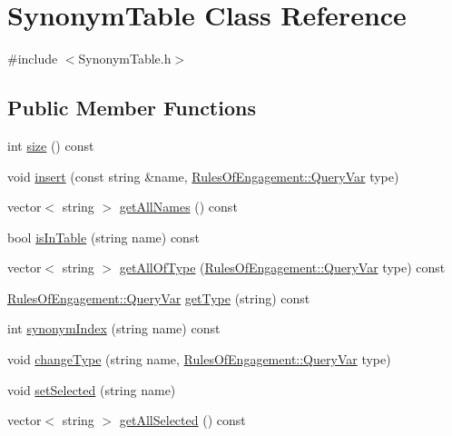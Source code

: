 \hypertarget{class_synonym_table}{\section{Synonym\-Table Class Reference}
\label{class_synonym_table}
}


{\ttfamily \#include $<$Synonym\-Table.\-h$>$}

\subsection*{Public Member Functions}
\begin{DoxyCompactItemize}
\item 
int \hyperlink{class_synonym_table_a8cddc6773a55141179cc844d39ed1c1f}{size} () const 
\item 
void \hyperlink{class_synonym_table_abda36f6346220b4d99efc9e522f57ac1}{insert} (const string \&name, \hyperlink{class_rules_of_engagement_a5dd2b28fd0c906d9b08e29e371713ead}{Rules\-Of\-Engagement\-::\-Query\-Var} type)
\item 
vector$<$ string $>$ \hyperlink{class_synonym_table_acb150fae4c378832b51b514da7d85bc2}{get\-All\-Names} () const 
\item 
bool \hyperlink{class_synonym_table_a8387324a38f3c938a9865723bf248654}{is\-In\-Table} (string name) const 
\item 
vector$<$ string $>$ \hyperlink{class_synonym_table_ab43bd9f067e43b73afa7c096cb56f07a}{get\-All\-Of\-Type} (\hyperlink{class_rules_of_engagement_a5dd2b28fd0c906d9b08e29e371713ead}{Rules\-Of\-Engagement\-::\-Query\-Var} type) const 
\item 
\hyperlink{class_rules_of_engagement_a5dd2b28fd0c906d9b08e29e371713ead}{Rules\-Of\-Engagement\-::\-Query\-Var} \hyperlink{class_synonym_table_a197ba9df88293f6178d9319674204c74}{get\-Type} (string) const 
\item 
int \hyperlink{class_synonym_table_aff4785f5fca983d12c47b006c508f58c}{synonym\-Index} (string name) const 
\item 
void \hyperlink{class_synonym_table_a7b9f79a7ea12a5b7ae0ff0f44a7bad0d}{change\-Type} (string name, \hyperlink{class_rules_of_engagement_a5dd2b28fd0c906d9b08e29e371713ead}{Rules\-Of\-Engagement\-::\-Query\-Var} type)
\item 
void \hyperlink{class_synonym_table_a1610d6c9bf13c7da6682aecaa34e3035}{set\-Selected} (string name)
\item 
vector$<$ string $>$ \hyperlink{class_synonym_table_a10082dabe233a4cc136012604fdd0c99}{get\-All\-Selected} () const 

\end{DoxyCompactItemize}
